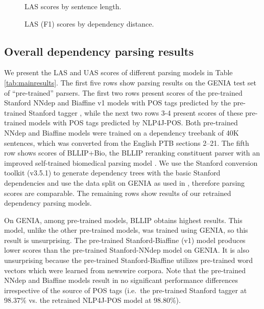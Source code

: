 \documentclass[twocolumn,hyperref]{bmcart}\pdfoutput=1
\begin{document}
\begin{figure*}[!t]
\centering

\caption{LAS scores by sentence length.}
\label{fig:LASbyLength}
\end{figure*}

\begin{figure*}[!t]
\centering

\caption{LAS (F1) scores by dependency distance.}
\label{fig:LASbyDistance}
\end{figure*}


\subsection*{Overall dependency parsing results}

We present the LAS and UAS scores of different parsing models in Table \ref{tab:mainresults}. 
{The first five rows show parsing results on the GENIA test set of ``pre-trained'' parsers. 
The first two rows  present scores of the pre-trained   Stanford NNdep and Biaffine v1  models  with POS tags predicted by the pre-trained Stanford tagger \cite{Toutanova:2003:FPT:1073445.1073478}, while  the next two rows 3-4 present scores of    these pre-trained models     with POS tags predicted by NLP4J-POS.} Both pre-trained NNdep and Biaffine models were trained on a dependency treebank of 40K sentences, which was 
 converted from the English PTB sections 2--21. 
{The fifth row shows  scores of BLLIP+Bio, the BLLIP reranking constituent parser \cite{charniak-johnson:2005:ACL} with an improved self-trained biomedical parsing model \cite{david2010}.}  
We use the Stanford conversion toolkit (v3.5.1) to generate dependency trees with the basic Stanford dependencies  
and use the data split on GENIA as  used in \cite{david2010}, therefore  parsing scores are comparable.  
The remaining rows show results  of our retrained dependency parsing models. 

On GENIA, among pre-trained models, BLLIP obtains highest results. This model, unlike the other pre-trained models, was trained using GENIA, so this result is unsurprising. The pre-trained Stanford-Biaffine  (v1) model produces lower scores than the pre-trained Stanford-NNdep model on GENIA. It is also unsurprising because the pre-trained Stanford-Biaffine utilizes pre-trained  word vectors  which were learned from newswire  corpora.  
Note that the pre-trained NNdep and Biaffine models result in no significant performance differences irrespective of the source of POS tags (i.e.\ the pre-trained Stanford tagger at 98.37\% vs. the retrained NLP4J-POS model at 98.80\%).
\end{document}

